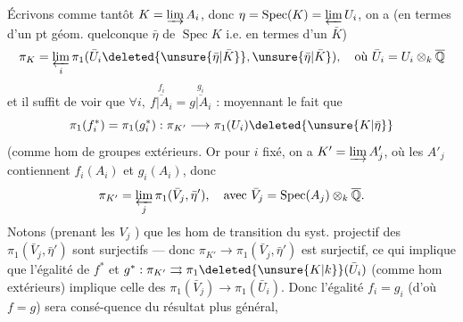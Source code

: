 Écrivons comme tantôt $K=\varinjlim A_i$, donc  $\eta=\operatorname{Spec}(K)=\varprojlim U_i$, on a (en termes d'un pt géom. quelconque $\bar\eta$ de $\operatorname{Spec}K$ i.e. en termes d'un $\bar K$)
\[
\pi_K=\varprojlim_i\pi_1(\bar U_i\deleted{\unsure{\bar\eta|\bar K}},\unsure{\bar\eta|\bar K}),\quad\text{où }\bar U_i=U_i\otimes_k\overline{\mathbb Q}
\]
et il suffit de voir que $\forall i,\ \overset{f_i}{\overline{f|A_i}}=\overset{g_i}{\overline{g|A_i}}$ : moyennant le fait que
\[
\pi_1(f_i^*)=\pi_1(g_i^*):\pi_{K'}\longrightarrow\pi_1(U_i)\deleted{\unsure{K|\bar\eta}}
\]
(comme hom de groupes extérieurs. Or pour $i$ fixé, on a $K'=\varinjlim A'_j$, où les $A'_j$ contiennent $f_i(A_i)$ et $g_i(A_i)$, donc
\[
\pi_{K'}=\varprojlim_j\pi_1(\bar V_j,\bar\eta'),\quad\text{avec }\bar V_j=\operatorname{Spec}(A_j)\otimes_k\overline{\mathbb Q}.
\]
Notons (prenant les $V_j$ ) que les hom de transition du syst. projectif des $\pi_1(\bar V_j,\bar\eta')$ sont surjectifs --- donc $\pi_{K'}\longrightarrow\pi_1(\bar V_j,\bar\eta')$ est surjectif, ce qui implique que l'égalité de $f^*$ et $g^*:\pi_{K'}\rightrightarrows\pi_1\deleted{\unsure{K|k}}(\bar U_i)$ (comme hom extérieurs) implique celle des $\pi_1(\bar V_j)\longrightarrow\pi_1(\bar U_i)$.
Donc l'égalité $f_i=g_i$ (d'où $f=g$) sera consé-quence du résultat plus général,
